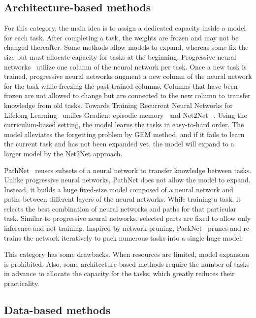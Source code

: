 \documentclass{article} \usepackage{iclr2020_conference,times}
\begin{document}
\subsection{Architecture-based methods}

For this category, the main idea is to assign a dedicated capacity inside a model for each task.
After completing a task, the weights are frozen and may not be changed thereafter.
Some methods allow models to expand, whereas some fix the size but must allocate capacity for tasks at the beginning.
Progressive neural networks~\citep{rusu2016progressive} utilize one column of the neural network per task.
Once a new task is trained, progressive neural networks augment a new column of the neural network for the task while freezing the past trained columns.
Columns that have been frozen are not allowed to change but are connected to the new column to transfer knowledge from old tasks.
Towards Training Recurrent Neural Networks for Lifelong Learning~\citep{sodhani2018training} unifies Gradient episodic memory~\citep{lopez2017gradient} and Net2Net ~\citep{chen2015net2net}.
Using the curriculum-based setting, the model learns the tasks in easy-to-hard order.
The model alleviates the forgetting problem by GEM method, and if it fails to learn the current task and has not been expanded yet, the model will expand to a larger model by the Net2Net approach.

PathNet~\citep{fernando2017pathnet} reuses subsets of a neural network to transfer knowledge between tasks. Unlike progressive neural networks, PathNet does not allow the model to expand. Instead, it builds a huge fixed-size model composed of a neural network and paths between different layers of the neural networks. While training a task, it selects the best combination of neural networks and paths for that particular task.
Similar to progressive neural networks, selected parts are fixed to allow only inference and not training. 
Inspired by network pruning, PackNet~\citep{mallya2018packnet}  prunes and re-trains the network iteratively to pack numerous tasks into a single huge model.



This category has some drawbacks. 
When resources are limited, model expansion is prohibited.
Also, some architecture-based methods require the number of tasks in advance to allocate the capacity for the tasks, which greatly reduces their practicality.



\subsection{Data-based methods}
\end{document}
